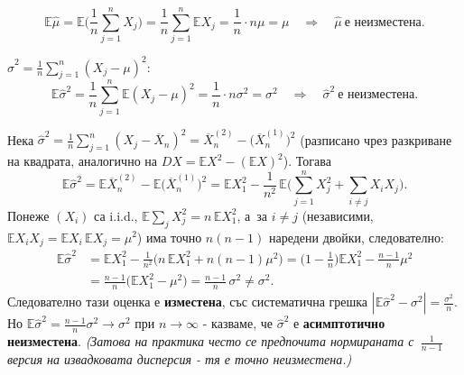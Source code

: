 \begin{rembox}[Пример: \texorpdfstring{$\hat\mu=\overline X_n$}{мю-капа=X-чертата}, \texorpdfstring{$X\sim N(\mu,\sigma^2)$}{X~N(мю,сигма^2)}]
\[
  \mathbb E\hat\mu = \mathbb E\Big(\frac1n\sum_{j=1}^n X_j\Big) = \frac1n\sum_{j=1}^n \mathbb EX_j = \frac1n\cdot n\mu = \mu \quad\Longrightarrow\quad \hat\mu\ \text{е неизместена.}
\]
\end{rembox}

\begin{rembox}
$\hat\sigma^2=\tfrac1n\sum_{j=1}^n(X_j-\mu)^2$:
\[
  \mathbb E\hat\sigma^2 = \frac1n\sum_{j=1}^n\mathbb E(X_j-\mu)^2 = \frac1n\cdot n\sigma^2 = \sigma^2 \quad\Longrightarrow\quad \hat\sigma^2\ \text{е неизместена.}
\]
\end{rembox}

\begin{rembox}
Нека $\hat\sigma^2 = \tfrac1n\sum_{j=1}^n(X_j-\overline X_n)^2 =
\overline X_n^{(2)} - \big(\overline X_n^{(1)}\big)^2$ (разписано
чрез разкриване на квадрата, аналогично на $DX=\mathbb EX^2-
(\mathbb EX)^2$). Тогава
\[
  \mathbb E\hat\sigma^2 = \mathbb E\overline X_n^{(2)} - \mathbb E\big(\overline X_n^{(1)}\big)^2 = \mathbb EX_1^2 - \frac1{n^2}\,\mathbb E\Big(\sum_{j=1}^n X_j^2 + \sum_{i\neq j}X_iX_j\Big).
\]
Понеже $(X_i)$ са i.i.d., $\mathbb E\sum_j X_j^2 = n\,\mathbb EX_1^2$,
а~за $i\neq j$ (независими, $\mathbb EX_iX_j=\mathbb EX_i\,\mathbb
EX_j=\mu^2$) има точно $n(n-1)$ наредени двойки, следователно:
\begin{align*}
  \mathbb E\hat\sigma^2 &= \mathbb EX_1^2 - \frac1{n^2}\Big(n\,\mathbb EX_1^2 + n(n-1)\mu^2\Big) = \Big(1-\frac1n\Big)\mathbb EX_1^2 - \frac{n-1}{n}\mu^2\\
  &= \frac{n-1}{n}\big(\mathbb EX_1^2-\mu^2\big) = \frac{n-1}{n}\,\sigma^2 \neq \sigma^2.
\end{align*}
Следователно тази оценка е \textbf{изместена}, със систематична
грешка $|\mathbb E\hat\sigma^2-\sigma^2|=\tfrac{\sigma^2}n$. Но
$\mathbb E\hat\sigma^2 = \tfrac{n-1}n\sigma^2 \to \sigma^2$ при $n\to\infty$ - казваме, че $\hat\sigma^2$
е \textbf{асимптотично неизместена}. \emph{(Затова на практика често
се предпочита нормираната с~$\tfrac1{n-1}$ версия на извадковата
дисперсия - тя е точно неизместена.)}
\end{rembox}


